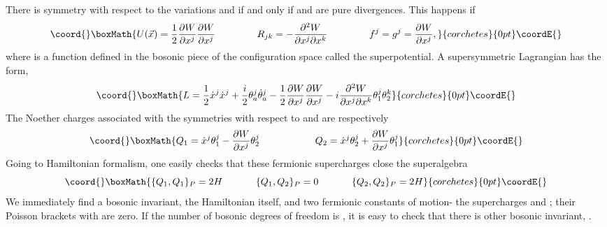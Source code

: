 \documentclass[a4paper,11pt,twoside]{article}
\begin{document}
There is symmetry with respect to the variations \coordHE{} and
\coordHE{} if and only if \coordHE{} and \coordHE{} are pure
divergences. This happens if
\[\coord{}\boxMath{
U(\vec{x})=\displaystyle\frac{1}{2} \displaystyle\frac{\partial
W}{\partial x^j} \displaystyle\frac{\partial W}{\partial x^j}
\hspace{1.5cm} R_{jk}=-\frac{\partial^2 W}{\partial x^j \partial
x^k} \hspace{1.5cm} f^j=g^j=\displaystyle\frac{\partial
W}{\partial x^j} ,
}{corchetes}{0pt}\coordE{}\]
where \coordHE{} is a function defined in the bosonic piece of
the configuration space called the superpotential. A
supersymmetric Lagrangian has the form,
\[\coord{}\boxMath{
L=\displaystyle\frac{1}{2} \dot{x}^j \dot{x}^j
+\displaystyle\frac{i}{2} \theta_a^j \dot{\theta}_a^j
-\displaystyle\frac{1}{2} \displaystyle\frac{\partial W}{\partial
x^j}\displaystyle\frac{\partial W}{\partial x^j}-i
\displaystyle\frac{\partial^2 W}{\partial x^j \partial x^k}
\theta_1^j \theta_2^k
}{corchetes}{0pt}\coordE{}\]
The Noether charges associated with the symmetries with respect to
\coordHE{} and \coordHE{} are respectively
\[\coord{}\boxMath{
Q_1=\dot{x}^j \theta_1^j- \displaystyle\frac{\partial W}{\partial
x^j} \theta_2^j \hspace{2cm} Q_2=\dot{x}^j \theta_2^j+
\displaystyle\frac{\partial W}{\partial x^j} \theta_1^j
}{corchetes}{0pt}\coordE{}\]
Going to Hamiltonian formalism, one easily checks that these
fermionic supercharges close the  \coordHE{} superalgebra
\[\coord{}\boxMath{
\{Q_1,Q_1 \}_P=2 H \hspace{1.2cm} \{Q_1,Q_2\}_P=0 \hspace{1.2cm} \{Q_2,Q_2\}_P=2 H
}{corchetes}{0pt}\coordE{}\]
We immediately find a bosonic invariant, the Hamiltonian \coordHE{}
itself, and two fermionic constants of motion- the supercharges
\coordHE{} and \coordHE{}; their Poisson brackets with \coordHE{} are zero. If the
number of bosonic degrees of freedom is \coordHE{}, it is easy to check
that there is other bosonic invariant,
\coordHE{} \cite{Pl}.
\end{document}
